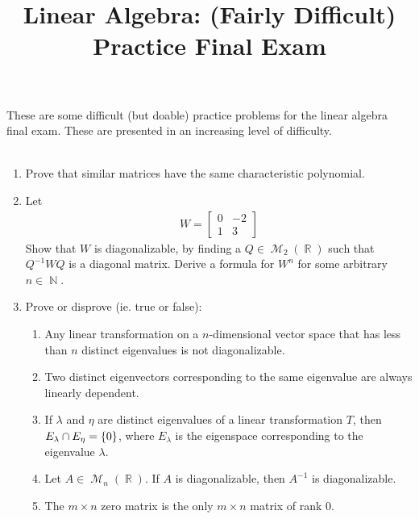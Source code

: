 \documentclass{amsart} %
\theoremstyle{mytheoremstyle}
\theoremstyle{definition}
\DeclareMathOperator{\N}{\mathbb{N}}
\DeclareMathOperator{\R}{\mathbb{R}}
\DeclareMathOperator{\1}{\mathbbm{1}}
\DeclareMathOperator{\MM}{\mathcal{M}}
\begin{document}
\title{Linear Algebra: (Fairly Difficult) Practice Final Exam}

\maketitle

\noindent These are some difficult (but doable) practice problems for the linear algebra final exam. These are presented in an increasing level of difficulty. \\\\


\begin{enumerate}[itemsep=1em]

	\item Prove that similar matrices have the same characteristic polynomial.

	\item Let 
	\begin{align*}
		W = \begin{bmatrix}
		0 & -2 \\ 1 & 3
		\end{bmatrix}
	\end{align*}
	Show that $W$ is diagonalizable, by finding a $Q \in \MM_2(\R)$ such that $Q^{-1} W Q $ is a diagonal matrix. Derive a formula for $W^{n}$ for some arbitrary $n \in \N$.


	\item Prove or disprove (ie. true or false):
	\begin{enumerate}
		\item Any linear transformation on a $n$-dimensional vector space that has less than $n$ distinct eigenvalues is not diagonalizable.
		
		\item Two distinct eigenvectors corresponding to the same eigenvalue are always linearly dependent.
		
		\item If $\lambda$ and $\eta$ are distinct eigenvalues of a linear transformation $T$, then $E_{\lambda} \cap E_{\eta} = \set{0}$, where $E_{\lambda}$ is the eigenspace corresponding to the eigenvalue $\lambda$.
		
		\item Let $A \in \MM_{n} (\R)$. If $A$ is diagonalizable, then $A^{-1}$ is diagonalizable.
		
		\item The $m \times n$ zero matrix is the only $m \times n$ matrix of rank $0$.
	\end{enumerate}


\end{enumerate}
\end{document}

